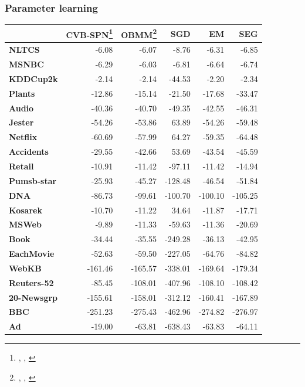 \documentclass[10pt, t, xcolor={usenames,dvipsnames,svgnames}, compress]{beamer}
\newcommand{\customcite}[1]{\footnote{\scriptsize \citeauthor{#1}, \citetitle{#1}, \citeyear{#1}}}
\begin{document}
\begin{frame}[t]
  \frametitle{Parameter learning}
  \vspace{-10pt}
  \begin{table}
    \centering
    \scriptsize
    \setlength{\tabcolsep}{3pt}  
    \begin{tabular}{l r r r r r}
      \toprule
      & \textsf{CVB-SPN}\customcite{Zhao2016a} &
                                                 \textsf{OBMM}\customcite{Rashwan2016} & \textsf{SGD}\footnotemark[48] & \textsf{EM}\footnotemark[48] & \textsf{SEG}\footnotemark[48] \\
      \midrule
      \textbf{NLTCS}      & -6.08   & -6.07   & -8.76   & -6.31   & -6.85   \\
      \textbf{MSNBC}      & -6.29   & -6.03   & -6.81   & -6.64   & -6.74   \\
      \textbf{KDDCup2k}   & -2.14   & -2.14   & -44.53  & -2.20   & -2.34   \\
      \textbf{Plants}     & -12.86  & -15.14  & -21.50  & -17.68  & -33.47  \\
      \textbf{Audio}      & -40.36  & -40.70  & -49.35  & -42.55  & -46.31  \\
      \textbf{Jester}     & -54.26  & -53.86  & 63.89   & -54.26  & -59.48  \\
      \textbf{Netflix}    & -60.69  & -57.99  & 64.27   & -59.35  & -64.48  \\
      \textbf{Accidents}  & -29.55  & -42.66  & 53.69   & -43.54  & -45.59  \\
      \textbf{Retail}     & -10.91  & -11.42  & -97.11  & -11.42  & -14.94  \\
      \textbf{Pumsb-star} & -25.93  & -45.27  & -128.48 & -46.54  & -51.84  \\
      \textbf{DNA}        & -86.73  & -99.61  & -100.70 & -100.10 & -105.25 \\
      \textbf{Kosarek}    & -10.70  & -11.22  & 34.64   & -11.87  & -17.71  \\
      \textbf{MSWeb}      & -9.89   & -11.33  & -59.63  & -11.36  & -20.69  \\
      \textbf{Book}       & -34.44  & -35.55  & -249.28 & -36.13  & -42.95  \\
      \textbf{EachMovie}  & -52.63  & -59.50  & -227.05 & -64.76  & -84.82  \\
      \textbf{WebKB}      & -161.46 & -165.57 & -338.01 & -169.64 & -179.34 \\
      \textbf{Reuters-52} & -85.45  & -108.01 & -407.96 & -108.10 & -108.42 \\
      \textbf{20-Newsgrp} & -155.61 & -158.01 & -312.12 & -160.41 & -167.89 \\
      \textbf{BBC}        & -251.23 & -275.43 & -462.96 & -274.82 & -276.97 \\
      \textbf{Ad}         & -19.00  & -63.81  & -638.43 & -63.83  & -64.11  \\
    \end{tabular}
    \label{tab:model-accs}
  \end{table}

\end{frame}
\end{document}
